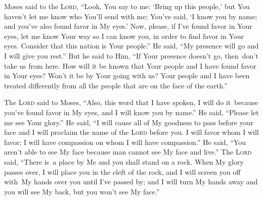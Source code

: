 \begin{inparaenum}
     Moses said to the \textsc{Lord}, ``Look, You say to me: `Bring up this people,' but You haven't let me know who You'll send with me; You've said, `I know you by name; and you've also found favor in My eyes.'%
     Now, please, if I've found favor in Your eyes, let me know Your way so I can know you, in order to find favor in Your eyes. Consider that this nation is Your people.''%
     He said, ``My presence will go and I will give you rest.''%
     But he said to Him, ``If Your presence doesn't go, then\understood\ don't take us from here.%
     How will it be known that Your people and I have found favor in Your eyes? Won't it be by Your going with us? Your people and I have been treated differently from all the people that are on the face of the earth.''%
    
     The \textsc{Lord} said to Moses, ``Also, this word that I have spoken, I will do it\understood\ because you've found favor in My eyes, and I will know you by name.''%
     He said, ``Please let me see Your glory.''%
     He said, ``I will cause all of My goodness to pass before your face and I will proclaim the name of the \textsc{Lord} before you. I will favor whom I will favor; I will have compassion on whom I will have compassion.''%
     He said, ``You aren't able to see My face because man cannot see My face and live.''%
     The \textsc{Lord} said, ``There is\understood\ a place by Me and you shall stand on a rock.%
     When My glory passes over, I will place you in the cleft of the rock, and I will screen you off with\understood\ My hands over you until I've passed by;%
     and I will turn My hands away and you will see My back, but you won't see My face.''%
\end{inparaenum}
